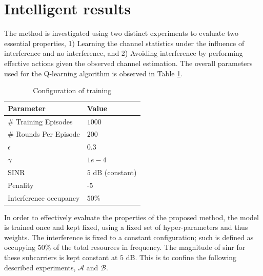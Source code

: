 \section{Intelligent results}\label{sec:RL_results}
The method is investigated using two distinct experiments to evaluate two essential properties, 1) Learning the channel statistics under the influence of interference and no interference, and 2) Avoiding interference by performing effective actions given the observed channel estimation. The overall parameters used for the Q-learning algorithm is observed in Table \ref{tab:q_learning_param}.

\begin{table}
\centering
\begin{tabular}{l|l}
\toprule
\textbf{Parameter}                 & \textbf{Value} \\ \midrule
\# Training Episodes & $1000$ \\
\# Rounds Per Episode & $200$ \\
$\epsilon$ & $0.3$\\
$\gamma$ & $1e-4$ \\
SINR & $5$ dB (constant) \\
Penality & -5 \\
Interference occupancy & $50\%$
\end{tabular}
\vspace{1em}
\caption{Configuration of training}\label{tab:q_learning_param}
\end{table}

In order to effectively evaluate the properties of the proposed method, the model is trained once and kept fixed, using a fixed set of hyper-parameters and thus weights. The interference is fixed to a constant configuration; such is defined as occupying $50\%$ of the total resources in frequency. The magnitude of \gls{sinr} for these subcarriers is kept constant at $5$ dB. This is to confine the following described experiments, $\mathcal{A}$ and $\mathcal{B}$. 

